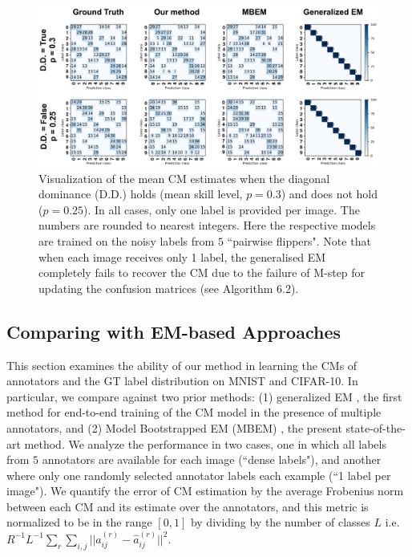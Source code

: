 \begin{figure}[t]
	\center
	\includegraphics[width=\linewidth]{chapter_4/figures/figures_new/figure_4.png}
	\caption{\small Visualization of the mean CM estimates when the diagonal dominance (D.D.) holds (mean skill level, $p=0.3$) and does not hold ($p=0.25$). In all cases, only one label is provided per image. The numbers are rounded to nearest integers. Here the respective models are trained on the noisy labels from $5$ ``pairwise flippers". Note that when each image receives only 1 label, the generalised EM \cite{raykar2009supervised} completely fails to recover the CM due to the failure of M-step for updating the confusion matrices (see Algorithm 6.2). }
	\label{fig:diagonal_dominance_violation}
\end{figure}





\subsection{Comparing with EM-based Approaches} \label{sec:comparison_with_em}
This section examines the ability of our method in learning the CMs of annotators and the GT label distribution on MNIST and CIFAR-10. In particular, we compare against two prior methods: (1) generalized EM \cite{raykar2010learning}, the first method for end-to-end training of the CM model in the presence of multiple annotators, and (2) Model Bootstrapped EM (MBEM) \cite{khetan2017learning}, the present state-of-the-art method. We analyze the performance in two cases, one in which all labels from $5$ annotators are available for each image (``dense labels"), and another where only one randomly selected annotator labels each example (``1 label per image"). We quantify the error of CM estimation by the average Frobenius norm between each CM and its estimate over the annotators, and this metric is normalized to be in the range $[0,1]$ by dividing by the number of classes $L$ i.e. $R^{-1}L^{-1}\sum_{r}\sum_{i,j}||a^{(r)}_{ij}-\hat{a}^{(r)}_{ij}||^2$.



